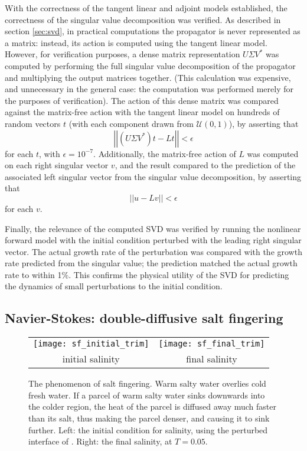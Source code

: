 \documentclass{siamltex}
\begin{document}
With the correctness of the tangent linear and adjoint models established, the correctness of
the singular value decomposition was verified. As described in section \ref{sec:svd}, in practical
computations the propagator is never represented as a matrix: instead, its action is computed
using the tangent linear model. However, for verification purposes, a dense matrix representation $U\Sigma V^*$ was
computed by performing the full singular value decomposition
of the propagator and multiplying the output matrices together.
(This calculation was expensive, and unnecessary in the general
case: the computation was performed merely for the purposes of verification). The action of this dense matrix
was compared against the matrix-free action with the tangent linear model on hundreds of random vectors $t$ (with
each component drawn from $\mathcal{U}\left(0, 1\right)$), by asserting that
\begin{equation}
  \left|\left|(U \Sigma V^*) t - Lt\right|\right| < \epsilon
\end{equation}
for each $t$, with $\epsilon = 10^{-7}$.
Additionally, the matrix-free action of $L$ was computed on each right singular vector $v$, and the
result compared to the prediction of the associated left singular vector from the singular value decomposition, by asserting that
\begin{equation}
  \left|\left|u - Lv\right|\right| < \epsilon
\end{equation}
for each $v$.

Finally, the relevance of the computed SVD was verified by running the nonlinear forward model
with the initial condition perturbed with the leading right singular vector. The actual growth rate of the perturbation
was compared with the growth rate predicted from the singular value; the prediction matched the actual
growth rate to within 1\%. This confirms the physical utility of the SVD for predicting the dynamics of small perturbations
to the initial condition.

\subsection{Navier-Stokes: double-diffusive salt fingering}

\begin{figure}
  \centering
  \begin{tabular}{cc}
    \texttt{[image: sf\_initial\_trim]} & \texttt{[image: sf\_final\_trim]}
    \\
    initial salinity & final salinity
  \end{tabular}
  \caption{The phenomenon of salt fingering. Warm salty water overlies cold fresh water. If a parcel of warm salty water
  sinks downwards into the colder region, the heat of the parcel is diffused away much faster than its salt, thus making
  the parcel denser, and causing it to sink further. Left: the initial condition for salinity, using the perturbed interface of \cite{ozgokmen1998b}. Right:
  the final salinity, at $T=0.05$.}
  \label{fig:salt_fingering}
\end{figure}
\end{document}
